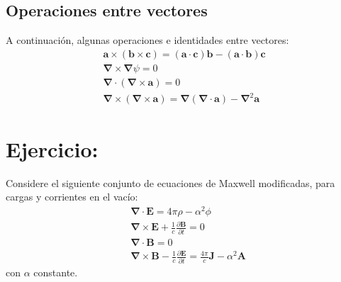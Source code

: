 





\begin{multicols}{2}

\begin{center}\section*{Operaciones entre vectores}\end{center}

A continuación, algunas operaciones e identidades entre vectores:
\begin{gather}
    \mathbf{a} \times \left(\mathbf{b} \times \mathbf{c}\right) = \left(\mathbf{a} \cdot \mathbf{c}\right)\mathbf{b} - \left(\mathbf{a} \cdot \mathbf{b}\right)\mathbf{c} \label{vec:1}\\
    \mathbf{\nabla} \times \mathbf{\nabla} \psi = 0 \label{vec:2}\\
    \mathbf{\nabla} \cdot \left(\mathbf{\nabla} \times \mathbf{a}\right) = 0 \label{vec:3}\\
    \mathbf{\nabla} \times \left(\mathbf{\nabla} \times \mathbf{a}\right) = \mathbf{\nabla} \left(\mathbf{\nabla} \cdot \mathbf{a}\right) - \mathbf{\nabla}^{2} \mathbf{a} \label{vec:4}
\end{gather}

\section*{Ejercicio:}

Considere el siguiente conjunto de ecuaciones de Maxwell modificadas, para cargas y corrientes en el vacío:
\begin{align}
    &\mathbf{\nabla} \cdot \mathbf{E} = 4\pi \rho - \alpha^{2} \phi \label{ecu:1} \\ 
    &\mathbf{\nabla} \times \mathbf{E} + \frac{1}{c} \frac{\partial \mathbf{B}}{\partial t} = 0 \label{ecu:2} \\ 
    &\mathbf{\nabla} \cdot \mathbf{B} = 0  \label{ecu:3} \\
    &\mathbf{\nabla} \times \mathbf{B} - \frac{1}{c} \frac{\partial \mathbf{E}}{\partial t} = \frac{4\pi}{c} \mathbf{J} - \alpha^{2} \mathbf{A} \label{ecu:4}
\end{align}
con $\alpha$ constante.


\end{multicols}
